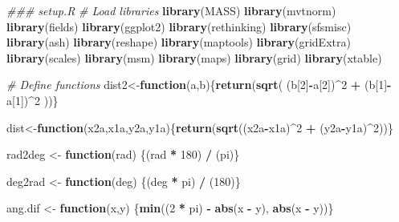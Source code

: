 \documentclass[
]{article}
\newenvironment{Shaded}{\begin{snugshade}}{\end{snugshade}}
\newcommand{\CommentTok}[1]{\textcolor[rgb]{0.56,0.35,0.01}{\textit{#1}}}
\newcommand{\ControlFlowTok}[1]{\textcolor[rgb]{0.13,0.29,0.53}{\textbf{#1}}}
\newcommand{\DecValTok}[1]{\textcolor[rgb]{0.00,0.00,0.81}{#1}}
\newcommand{\KeywordTok}[1]{\textcolor[rgb]{0.13,0.29,0.53}{\textbf{#1}}}
\newcommand{\NormalTok}[1]{#1}
\newcommand{\OperatorTok}[1]{\textcolor[rgb]{0.81,0.36,0.00}{\textbf{#1}}}
\newcommand{\StringTok}[1]{\textcolor[rgb]{0.31,0.60,0.02}{#1}}
\begin{document}
\begin{Shaded}
\begin{Highlighting}[]
{\CommentTok{### setup.R}
\CommentTok{# Load libraries}
     \KeywordTok{library}\NormalTok{(MASS)}
     \KeywordTok{library}\NormalTok{(mvtnorm)}
     \KeywordTok{library}\NormalTok{(fields)}
     \KeywordTok{library}\NormalTok{(ggplot2)}
     \KeywordTok{library}\NormalTok{(rethinking)  }
     \KeywordTok{library}\NormalTok{(sfsmisc)}
     \KeywordTok{library}\NormalTok{(ash)}
     \KeywordTok{library}\NormalTok{(reshape)}
     \KeywordTok{library}\NormalTok{(maptools)}
     \KeywordTok{library}\NormalTok{(gridExtra)}
     \KeywordTok{library}\NormalTok{(scales)}
     \KeywordTok{library}\NormalTok{(msm)}
     \KeywordTok{library}\NormalTok{(maps)}
     \KeywordTok{library}\NormalTok{(grid)}
     \KeywordTok{library}\NormalTok{(xtable)}
    
    \CommentTok{# Define functions}
\NormalTok{     dist2<-}\ControlFlowTok{function}\NormalTok{(a,b)\{}\KeywordTok{return}\NormalTok{(}\KeywordTok{sqrt}\NormalTok{( (b[}\DecValTok{2}\NormalTok{]}\OperatorTok{-}\NormalTok{a[}\DecValTok{2}\NormalTok{])}\OperatorTok{^}\DecValTok{2}   \OperatorTok{+}\StringTok{ }\NormalTok{(b[}\DecValTok{1}\NormalTok{]}\OperatorTok{-}\NormalTok{a[}\DecValTok{1}\NormalTok{])}\OperatorTok{^}\DecValTok{2}\NormalTok{ ))\}  }
    
\NormalTok{     dist<-}\ControlFlowTok{function}\NormalTok{(x2a,x1a,y2a,y1a)\{}\KeywordTok{return}\NormalTok{(}\KeywordTok{sqrt}\NormalTok{((x2a}\OperatorTok{-}\NormalTok{x1a)}\OperatorTok{^}\DecValTok{2} \OperatorTok{+}\StringTok{ }\NormalTok{(y2a}\OperatorTok{-}\NormalTok{y1a)}\OperatorTok{^}\DecValTok{2}\NormalTok{))\}  }
    
\NormalTok{     rad2deg <-}\StringTok{ }\ControlFlowTok{function}\NormalTok{(rad) \{(rad }\OperatorTok{*}\StringTok{ }\DecValTok{180}\NormalTok{) }\OperatorTok{/}\StringTok{ }\NormalTok{(pi)\}}
    
\NormalTok{     deg2rad <-}\StringTok{ }\ControlFlowTok{function}\NormalTok{(deg) \{(deg }\OperatorTok{*}\StringTok{ }\NormalTok{pi) }\OperatorTok{/}\StringTok{ }\NormalTok{(}\DecValTok{180}\NormalTok{)\}}
    
\NormalTok{     ang.dif <-}\StringTok{ }\ControlFlowTok{function}\NormalTok{(x,y) \{}\KeywordTok{min}\NormalTok{((}\DecValTok{2} \OperatorTok{*}\StringTok{ }\NormalTok{pi) }\OperatorTok{-}\StringTok{ }\KeywordTok{abs}\NormalTok{(x }\OperatorTok{-}\StringTok{ }\NormalTok{y), }\KeywordTok{abs}\NormalTok{(x }\OperatorTok{-}\StringTok{ }\NormalTok{y))\}}
    
}
\end{Highlighting}
\end{Shaded}
\end{document}
